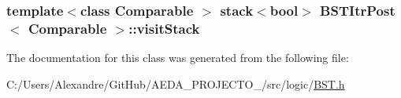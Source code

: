 \subsubsection[{visit\+Stack}]{\setlength{\rightskip}{0pt plus 5cm}template$<$class Comparable $>$ stack$<$bool$>$ {\bf B\+S\+T\+Itr\+Post}$<$ Comparable $>$\+::visit\+Stack\hspace{0.3cm}{\ttfamily [private]}}\label{class_b_s_t_itr_post_a5a9af907c7b135acdf3b5ed9affbb9a7}


The documentation for this class was generated from the following file\+:\begin{DoxyCompactItemize}
\item 
C\+:/\+Users/\+Alexandre/\+Git\+Hub/\+A\+E\+D\+A\+\_\+\+P\+R\+O\+J\+E\+C\+T\+O\+\_/src/logic/\hyperlink{_b_s_t_8h}{B\+S\+T.\+h}\end{DoxyCompactItemize}
